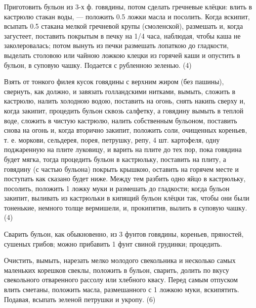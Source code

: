 
Приготовить бульон из 3-х ф. говядины, потом сделать гречневые клёцки: влить в кастрюлю стакан воды, — положить 0.5 ложки масла и посолить. Когда вскипит, всыпать 0.5 стакана мелкой гречневой крупы (смоленской), размешать и, когда загустеет, поставить покрытым в печку на 1/4 часа, наблюдая, чтобы каша не заколеровалась; потом вынуть из печки размешать лопаткою до гладкости, выделать столовою или чайною ложкою клецки из горячей каши и опустить в бульон, в суповую чашку. Подается с рубленною зеленью. (4)


Взять от тонкого филея кусок говядины с верхним жиром (без пашины), свернуть, как должно, и завязать голландскими нитками, вымыть, сложить в кастрюлю, налить холодною водою, поставить на огонь, снять накипь сверху и, когда закипит, процедить бульон сквозь салфетку, а говядину вымыть в теплой воде, сложить в чистую кастрюлю, налить собственным бульоном, поставить снова на огонь и, когда вторично закипит, положить соли, очищенных кореньев, т. е. моркови, сельдерея, порея, петрушку, репу, 4 шт. картофеля, одну поджаренную на плите луковицу, и варить на плите до тех пор, пока говядина будет мягка, тогда процедить бульон в кастрюльку, поставить на плиту, а говядину (с частью бульона) покрыть крышкою, оставить на горячем месте и поступать как сказано будет ниже. Между тем разбить одно яйцо в кастрюльку, посолить, положить 1 ложку муки и размешать до гладкости; когда бульон закипит, выливать из кастрюльки в кипящий бульон клёцки так, чтобы они были тоненькие, немного толще вермишели, и, прокипятив, вылить в суповую чашку. (4)


Сварить бульон, как обыкновенно, из 3 фунтов говядины, кореньев, пряностей, сушеных грибов; можно прибавить 1 фунт свиной грудинки; процедить.

Очистить, вымыть, нарезать мелко молодого свекольника и несколько самых маленьких корешков свеклы, положить в бульон, сварить, долить по вкусу свекольного отваренного рассолу или хлебного квасу. Перед самым отпуском влить сметаны, положить масла, размешанного с 1 ложкою муки, вскипятить. Подавая, всыпать зеленой петрушки и укропу. (6)


